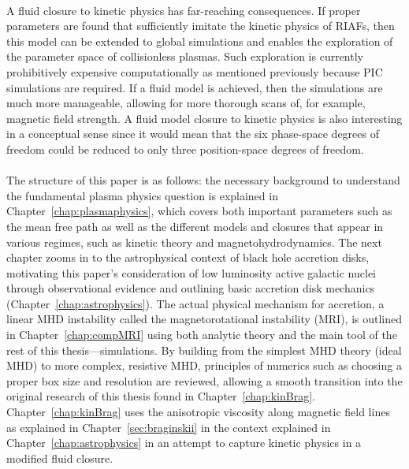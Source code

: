 \\
A fluid closure to kinetic physics has far-reaching consequences. If proper parameters are found that sufficiently imitate the kinetic physics of RIAFs, then this model can be extended to global simulations and enables the exploration of the parameter space of collisionless plasmas. Such exploration is currently prohibitively expensive computationally as mentioned previously because PIC simulations are required. If a fluid model is achieved, then the simulations are much more manageable, allowing for more thorough scans of, for example, magnetic field strength. A fluid model closure to kinetic physics is also interesting in a conceptual sense since it would mean that the six phase-space degrees of freedom could be reduced to only three position-space degrees of freedom. \\
\\
The structure of this paper is as follows: the necessary background to understand the fundamental plasma physics question is explained in Chapter~\ref{chap:plasmaphysics}, which covers both important parameters such as the mean free path as well as the different models and closures that appear in various regimes, such as kinetic theory and magnetohydrodynamics. The next chapter zooms in to the astrophysical context of black hole accretion disks, motivating this paper's consideration of low luminosity active galactic nuclei through observational evidence and outlining basic accretion disk mechanics (Chapter~\ref{chap:astrophysics}). The actual physical mechanism for accretion, a linear MHD instability called the magnetorotational instability (MRI), is outlined in Chapter~\ref{chap:compMRI} using both analytic theory and the main tool of the rest of this thesis---simulations. By building from the simplest MHD theory (ideal MHD) to more complex, resistive MHD, principles of numerics such as choosing a proper box size and resolution are reviewed, allowing a smooth transition into the original research of this thesis found in Chapter~\ref{chap:kinBrag}. Chapter~\ref{chap:kinBrag} uses the anisotropic viscosity along magnetic field lines as explained in Chapter~\ref{sec:braginskii} in the context explained in Chapter~\ref{chap:astrophysics} in an attempt to capture kinetic physics in a modified fluid closure. 


